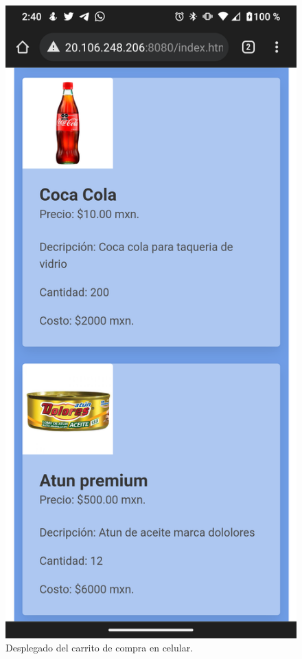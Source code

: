 \documentclass[11pt]{article}
\begin{document}
		\begin{figure}[H]
			\centering
			\includegraphics[scale=0.27]{resources/Screenshot_20211113-024007.png}
			\caption{Desplegado del carrito de compra en celular.}\label{fig:picture}
		\end{figure}
\end{document}
